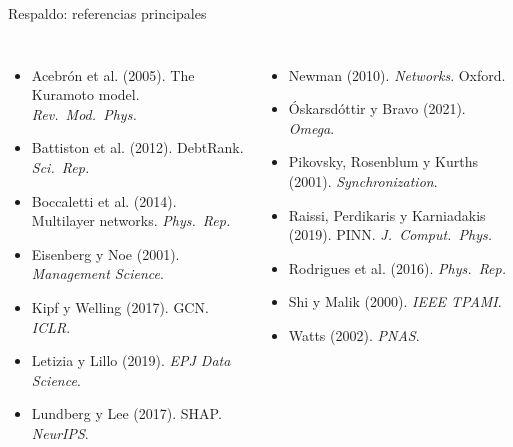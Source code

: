 \documentclass[aspectratio=169,11pt]{beamer}
\begin{document}
\begin{frame}{Respaldo: referencias principales}
\scriptsize
\begin{columns}[T]
\begin{itemize}
\item Acebrón et al. (2005). The Kuramoto model. \emph{Rev.\ Mod.\ Phys.}
\item Battiston et al. (2012). DebtRank. \emph{Sci.\ Rep.}
\item Boccaletti et al. (2014). Multilayer networks. \emph{Phys.\ Rep.}
\item Eisenberg y Noe (2001). \emph{Management Science}.
\item Kipf y Welling (2017). GCN. \emph{ICLR}.
\item Letizia y Lillo (2019). \emph{EPJ Data Science}.
\item Lundberg y Lee (2017). SHAP. \emph{NeurIPS}.
\end{itemize}
\begin{itemize}
\item Newman (2010). \emph{Networks}. Oxford.
\item Óskarsdóttir y Bravo (2021). \emph{Omega}.
\item Pikovsky, Rosenblum y Kurths (2001). \emph{Synchronization}.
\item Raissi, Perdikaris y Karniadakis (2019). PINN. \emph{J.\ Comput.\ Phys.}
\item Rodrigues et al. (2016). \emph{Phys.\ Rep.}
\item Shi y Malik (2000). \emph{IEEE TPAMI}.
\item Watts (2002). \emph{PNAS}.
\end{itemize}
\end{columns}
\end{frame}
\end{document}
